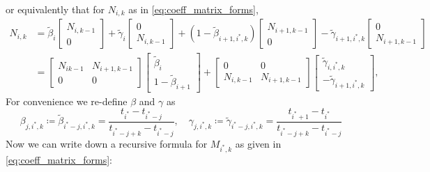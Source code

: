 or equivalently that for $N_{i, k}$ as in \eqref{eq:coeff_matrix_forms},
\begin{equation}
  \begin{aligned}
    N_{i,k} & = \tilde \beta_i \begin{bmatrix} N_{i, k-1} \\ 0 \end{bmatrix} + \tilde \gamma_i \begin{bmatrix}
      0 \\ N_{i, k-1}  \end{bmatrix} + (1 - \tilde \beta_{i+1, i^*, k}) \begin{bmatrix}
      N_{i+1, k-1} \\ 0  \end{bmatrix} - \tilde \gamma_{i+1, i^*, k} \begin{bmatrix}  0 \\ N_{i+1, k-1}  \end{bmatrix} \\
            & = \begin{bmatrix} N_{i k-1} & N_{i+1, k-1} \\ 0 & 0 \end{bmatrix} \begin{bmatrix} \tilde \beta_i \\ 1 - \tilde \beta_{i+1} \end{bmatrix} + \begin{bmatrix} 0 & 0 \\ N_{i, k-1} & N_{i+1, k-1} \end{bmatrix} \begin{bmatrix} \tilde \gamma_{i, i^*, k} \\ -\tilde \gamma_{i+1, i^*, k} \end{bmatrix},
  \end{aligned}
\end{equation}
For convenience we re-define $\beta$ and $\gamma$ as
\begin{equation}
  \beta_{j, i^*, k} \coloneq \tilde \beta_{i^* - j, i^*, k} = \frac{t_{i^*} - t_{i^* - j}}{t_{i^* - j + k} - t_{i^* - j}}, \quad \gamma_{j, i^*, k} \coloneq \tilde \gamma_{i^* - j, i^*, k} = \frac{t_{i^*+1} - t_{i^*}}{t_{i^* - j + k} - t_{i^* - j}}
\end{equation}
Now we can write down a recursive formula for $M_{i^*, k}$ as given in \eqref{eq:coeff_matrix_forms}:

